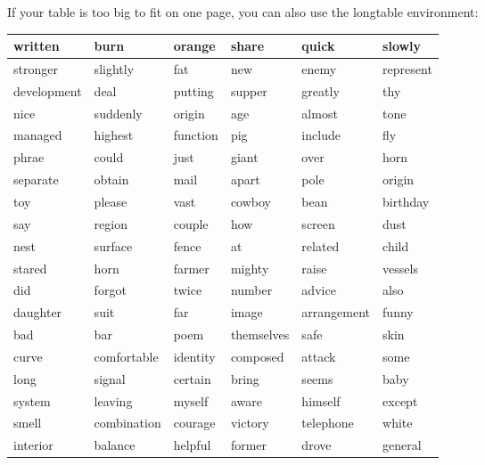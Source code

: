 \documentclass{jcls}
\begin{document}
If your table is too big to fit on one page, you can also use the longtable environment:

\begin{fullwidth}
	\begin{longtable}{@{}llllll@{}}
		written     & burn        & orange   & share      & quick       & slowly    \\* \midrule
		\endhead
		\endfoot
		\endlastfoot
		stronger    & slightly    & fat      & new        & enemy       & represent \\
		development & deal        & putting  & supper     & greatly     & thy       \\
		nice        & suddenly    & origin   & age        & almost      & tone      \\
		managed     & highest     & function & pig        & include     & fly       \\
		phrae       & could       & just     & giant      & over        & horn      \\
		separate    & obtain      & mail     & apart      & pole        & origin    \\
		toy         & please      & vast     & cowboy     & bean        & birthday  \\
		say         & region      & couple   & how        & screen      & dust      \\
		nest        & surface     & fence    & at         & related     & child     \\
		stared      & horn        & farmer   & mighty     & raise       & vessels   \\
		did         & forgot      & twice    & number     & advice      & also      \\
		daughter    & suit        & far      & image      & arrangement & funny     \\
		bad         & bar         & poem     & themselves & safe        & skin      \\
		curve       & comfortable & identity & composed   & attack      & some      \\
		long        & signal      & certain  & bring      & seems       & baby      \\
		system      & leaving     & myself   & aware      & himself     & except    \\
		smell       & combination & courage  & victory    & telephone   & white     \\
		interior    & balance     & helpful  & former     & drove       & general   \\

\end{longtable}
\end{fullwidth}
\end{document}
